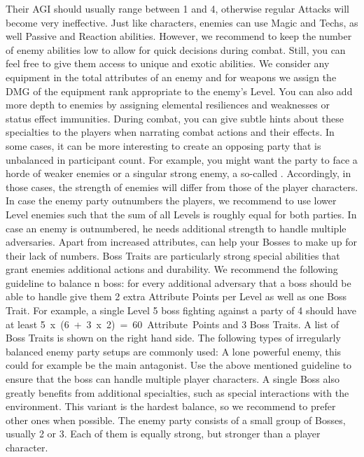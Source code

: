 Their AGI should usually range between 1 and 4, otherwise regular Attacks will become very ineffective.
Just like characters, enemies can use Magic and Techs, as well Passive and Reaction abilities.
However, we recommend to keep the number of enemy abilities low to allow for quick decisions during combat.
Still, you can feel free to give them access to unique and exotic abilities.
We consider any equipment in the total attributes of an enemy and for weapons we assign the DMG of the equipment rank appropriate to the enemy's Level.
You can also add more depth to enemies by assigning elemental resiliences and weaknesses or status effect immunities.
During combat, you can give subtle hints about these specialties to the players when narrating combat actions and their effects.
%
\vfill
%
In some cases, it can be more interesting to create an opposing party that is unbalanced in participant count.
For example, you might want the party to face a horde of weaker enemies or a singular strong enemy, a so-called .
Accordingly, in those cases, the strength of enemies will differ from those of the player characters.
In case the enemy party outnumbers the players, we recommend to use lower Level enemies such that the sum of all Levels is roughly equal for both parties.
In case an enemy is outnumbered, he needs additional strength to handle multiple adversaries.
Apart from increased attributes,  can help your Bosses to make up for their lack of numbers.
Boss Traits are particularly strong special abilities that grant enemies additional actions and durability. 
We recommend the following guideline to balance n boss: for every additional adversary that a boss should be able to handle give them 2 extra Attribute Points per Level as well as one Boss Trait.
For example, a single Level 5 boss fighting against a party of 4 should have at least \mbox{5 x (6 + 3 x 2) = 60 Attribute Points} and 3 Boss Traits.
A list of Boss Traits is shown on the right hand side.
%
\vfill
%
The following types of irregularly balanced enemy party setups are commonly used:
\ofrow
{}
A lone powerful enemy, this could for example be the main antagonist.
Use the above mentioned guideline to ensure that the boss can handle multiple player characters.
A single Boss also greatly benefits from additional specialties, such as special interactions with the environment.
This variant is the hardest balance, so we recommend to prefer other ones when possible.
\ofrow
{} 
The enemy party consists of a small group of Bosses, usually 2 or 3.
Each of them is equally strong, but stronger than a player character.
